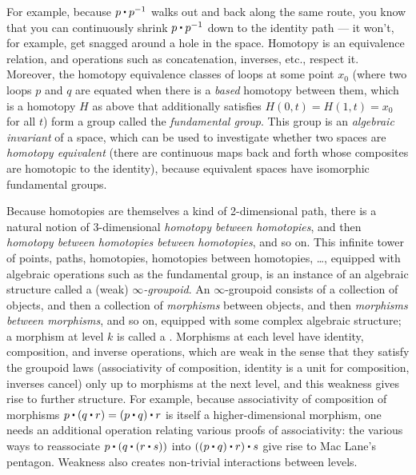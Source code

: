 For example, because
$p \ct \opp p$ walks out and back along the same route, you know that
you can continuously shrink $p \ct \opp p$ down to the identity
path --- it won't, for example, get snagged around a hole in the space.
Homotopy is an equivalence relation, and operations such as
concatenation, inverses, etc., respect it.  Moreover, the homotopy
equivalence classes of loops at some point $x_0$ (where two loops $p$
and $q$ are equated when there is a \emph{based} homotopy between them,
which is a homotopy $H$ as above that additionally satisfies $H(0,t) =
H(1,t) = x_0$ for all $t$) form a group called the \emph{fundamental
  group}.  This group is an \emph{algebraic invariant} of a space, which
can be used to investigate whether two spaces are \emph{homotopy
  equivalent} (there are continuous maps back and forth whose composites
are homotopic to the identity), because equivalent spaces have
isomorphic fundamental groups.

Because homotopies are themselves a kind of 2-dimensional path, there is
a natural notion of 3-dimensional \emph{homotopy between homotopies},
and then \emph{homotopy between homotopies between homotopies}, and so
on.  This infinite tower of points, paths, homotopies, homotopies between
homotopies, \ldots, equipped with algebraic operations such as the
fundamental group, is an instance of an algebraic structure called a
(weak) \emph{$\infty$-groupoid}.  An $\infty$-groupoid consists of a
collection of objects, and then a collection of \emph{morphisms} between
objects, and then \emph{morphisms between morphisms}, and so on,
equipped with some complex algebraic structure; a morphism at level $k$ is called a .  Morphisms at each level
have identity, composition, and inverse operations, which are weak in
the sense that they satisfy the groupoid laws (associativity of
composition, identity is a unit for composition, inverses cancel) only
up to morphisms at the next level, and this weakness gives rise to
further structure. For example, because associativity of composition of
morphisms $p \ct (q \ct r) = (p \ct q) \ct r$ is itself a
higher-dimensional morphism, one needs an additional operation relating
various proofs of associativity: the various ways to reassociate $p \ct
(q \ct (r \ct s))$ into $((p \ct q) \ct r) \ct s$ give rise to Mac
Lane's pentagon.  Weakness also creates non-trivial interactions between
levels.

